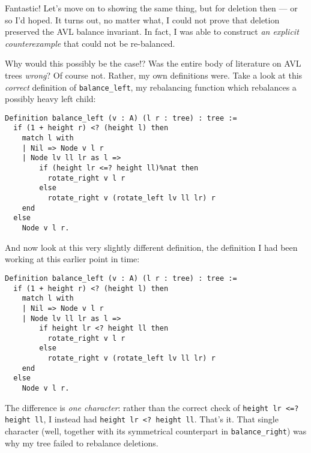 \documentclass[acmsmall, authorversion, nonacm, overload]{acmart}
\begin{document}
\vspace{1em}
\noindent Fantastic!
Let's move on to showing the same thing, but for deletion then --- or so I'd hoped.
It turns out, no matter what, I could not prove that deletion preserved the AVL balance invariant.
In fact, I was able to construct \emph{an explicit counterexample} that could not be re-balanced.

Why would this possibly be the case!? Was the entire body of literature on AVL trees \emph{wrong}?
Of course not.
Rather, my own definitions were.
Take a look at this \emph{correct} definition of \verb|balance_left|,
my rebalancing function which rebalances a possibly heavy left child:
\begin{verbatim}
Definition balance_left (v : A) (l r : tree) : tree :=
  if (1 + height r) <? (height l) then
    match l with
    | Nil => Node v l r
    | Node lv ll lr as l =>
        if (height lr <=? height ll)%nat then
          rotate_right v l r
        else
          rotate_right v (rotate_left lv ll lr) r
    end
  else
    Node v l r.
\end{verbatim}
And now look at this very slightly different definition, the definition I had been working at this earlier
point in time:
\begin{verbatim}
Definition balance_left (v : A) (l r : tree) : tree :=
  if (1 + height r) <? (height l) then
    match l with
    | Nil => Node v l r
    | Node lv ll lr as l =>
        if height lr <? height ll then
          rotate_right v l r
        else
          rotate_right v (rotate_left lv ll lr) r
    end
  else
    Node v l r.
\end{verbatim}
The difference is \emph{one character}:
rather than the correct check of \texttt{height lr <=? height ll},
I instead had \texttt{height lr <? height ll}.
That's it.
That single character (well, together with its symmetrical counterpart in \verb|balance_right|)
was why my tree failed to rebalance deletions.
\end{document}
